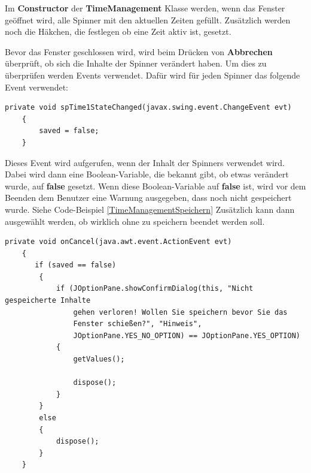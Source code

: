 \vspace{10pt}

Im \textbf{Constructor} der \textbf{TimeManagement} Klasse werden, wenn das Fenster geöffnet wird, alle Spinner mit den aktuellen Zeiten gefüllt. Zusätzlich werden noch die Häkchen, die festlegen ob eine Zeit aktiv ist, gesetzt.

\vspace{10pt}

Bevor das Fenster geschlossen wird, wird beim Drücken von \textbf{Abbrechen} überprüft, ob sich die Inhalte der Spinner verändert haben. Um dies zu überprüfen werden Events verwendet. Dafür wird für jeden Spinner das folgende Event verwendet:

\newpage

\begin{lstlisting}[style=JavaStyle, caption=Spinner Event]
    private void spTime1StateChanged(javax.swing.event.ChangeEvent evt)                                     
    {                                         
        saved = false;
    }   
\end{lstlisting} 
Dieses Event wird aufgerufen, wenn der Inhalt der Spinners verwendet wird. Dabei wird dann eine Boolean-Variable, die bekannt gibt, ob etwas verändert wurde, auf \textbf{false} gesetzt. Wenn diese Boolean-Variable auf \textbf{false} ist, wird vor dem Beenden dem Benutzer eine Warnung ausgegeben, dass noch nicht gespeichert wurde. Siehe Code-Beispiel \ref{TimeManagementSpeichern} Zusätzlich kann dann ausgewählt werden, ob wirklich ohne zu speichern beendet werden soll.

\begin{lstlisting}[style=Javastyle, caption=TimeManagement Fenster schließen, label=TimeManagementSpeichern]
 private void onCancel(java.awt.event.ActionEvent evt)                          
    {                              
       if (saved == false)
        {
            if (JOptionPane.showConfirmDialog(this, "Nicht gespeicherte Inhalte 
            	gehen verloren! Wollen Sie speichern bevor Sie das 
            	Fenster schießen?", "Hinweis", 
            	JOptionPane.YES_NO_OPTION) == JOptionPane.YES_OPTION)
            {
                getValues();
                
                dispose();
            }
        }
        else
        {
            dispose();
        }
    }
\end{lstlisting}

\vspace{10pt}

